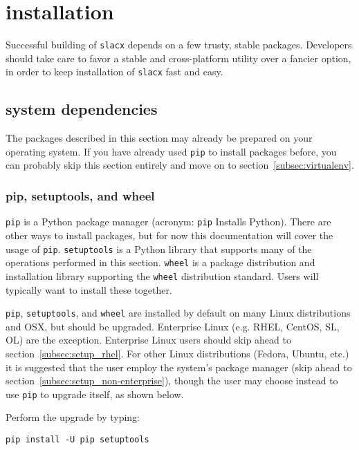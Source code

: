 \chapter{installation}
\label{ch:installation}
\lstset{language=Bash}

Successful building of \verb|slacx| depends on a few trusty, stable packages.
Developers should take care to favor a stable and cross-platform utility
over a fancier option, in order to keep installation of \verb|slacx| fast and easy.


\section{system dependencies}

The packages described in this section 
may already be prepared on your operating system.
If you have already used \verb|pip| to install packages before,
you can probably skip this section entirely
and move on to section~\ref{subsec:virtualenv}.


\subsection{pip, setuptools, and wheel}

\verb|pip| is a Python package manager
(acronym: \verb|pip| Installs Python). 
There are other ways to install packages, but for now
this documentation will cover the usage of \verb|pip|.
\verb|setuptools| is a Python library that supports
many of the operations performed in this section.
\verb|wheel| is a package distribution and installation library 
supporting the \verb|wheel| distribution standard.
Users will typically want to install these together.

\verb|pip|, \verb|setuptools|, and \verb|wheel| are installed by default 
on many Linux distributions and OSX, but should be upgraded.
Enterprise Linux (e.g. RHEL, CentOS, SL, OL) are the exception.
Enterprise Linux users should skip ahead 
to section~\ref{subsec:setup_rhel}.
For other Linux distributions (Fedora, Ubuntu, etc.)
it is suggested that the user employ the system's package manager 
(skip ahead to section~\ref{subsec:setup_non-enterprise}),
though the user may choose instead 
to use \verb|pip| to upgrade itself, as shown below.

Perform the upgrade by typing:
\begin{lstlisting}
pip install -U pip setuptools
\end{lstlisting}


